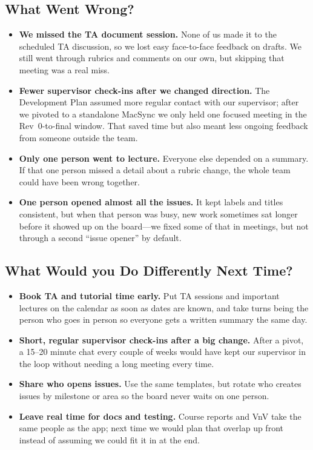 \documentclass{article}
\begin{document}
\subsection{What Went Wrong?}

\begin{itemize}
  \item \textbf{We missed the TA document session.} None of us made it to the
        scheduled TA discussion, so we lost easy face-to-face feedback on drafts.
        We still went through rubrics and comments on our own, but skipping that
        meeting was a real miss.
  \item \textbf{Fewer supervisor check-ins after we changed direction.} The
        Development Plan assumed more regular contact with our supervisor; after
        we pivoted to a standalone MacSync we only held one focused meeting in the
        Rev~0-to-final window. That saved time but also meant less ongoing feedback
        from someone outside the team.
  \item \textbf{Only one person went to lecture.} Everyone else depended on a
        summary. If that one person missed a detail about a rubric change, the
        whole team could have been wrong together.
  \item \textbf{One person opened almost all the issues.} It kept labels and
        titles consistent, but when that person was busy, new work sometimes sat
        longer before it showed up on the board---we fixed some of that in
        meetings, but not through a second ``issue opener'' by default.
\end{itemize}

\subsection{What Would you Do Differently Next Time?}

\begin{itemize}
  \item \textbf{Book TA and tutorial time early.} Put TA sessions and important
        lectures on the calendar as soon as dates are known, and take turns being
        the person who goes in person so everyone gets a written summary the
        same day.
  \item \textbf{Short, regular supervisor check-ins after a big change.} After a
        pivot, a 15--20 minute chat every couple of weeks would have kept our
        supervisor in the loop without needing a long meeting every time.
  \item \textbf{Share who opens issues.} Use the same templates, but rotate who
        creates issues by milestone or area so the board never waits on one
        person.
  \item \textbf{Leave real time for docs and testing.} Course reports and VnV
        take the same people as the app; next time we would plan that overlap up
        front instead of assuming we could fit it in at the end.
\end{itemize}
\end{document}
